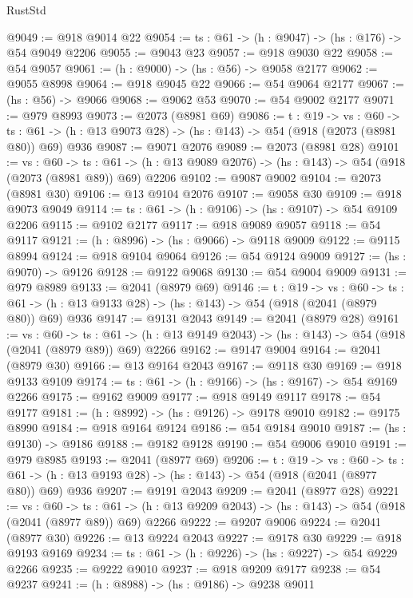 \begin{lexlean}{RustStd}
\begin{coremodule}
@9049 := @918 @9014 @22
@9054 := {ts : @61} -> (h : @9047) -> (hs : @176) -> @54 @9049 @2206
@9055 := @9043 @23
@9057 := @918 @9030 @22
@9058 := @54 @9057
@9061 := (h : @9000) -> (hs : @56) -> @9058 @2177
@9062 := @9055 @8998
@9064 := @918 @9045 @22
@9066 := @54 @9064 @2177
@9067 := (hs : @56) -> @9066
@9068 := @9062 @53
@9070 := @54 @9002 @2177
@9071 := @979 @8993
@9073 := @2073 (@8981 @69)
@9086 := {t : @19} ->
  {vs : @60} ->
  {ts : @61} -> (h : @13 @9073 @28) -> (hs : @143) -> @54 (@918 (@2073 (@8981 @80)) @69) @936
@9087 := @9071 @2076
@9089 := @2073 (@8981 @28)
@9101 := {vs : @60} ->
  {ts : @61} -> (h : @13 @9089 @2076) -> (hs : @143) -> @54 (@918 (@2073 (@8981 @89)) @69) @2206
@9102 := @9087 @9002
@9104 := @2073 (@8981 @30)
@9106 := @13 @9104 @2076
@9107 := @9058 @30
@9109 := @918 @9073 @9049
@9114 := {ts : @61} -> (h : @9106) -> (hs : @9107) -> @54 @9109 @2206
@9115 := @9102 @2177
@9117 := @918 @9089 @9057
@9118 := @54 @9117
@9121 := (h : @8996) -> (hs : @9066) -> @9118 @9009
@9122 := @9115 @8994
@9124 := @918 @9104 @9064
@9126 := @54 @9124 @9009
@9127 := (hs : @9070) -> @9126
@9128 := @9122 @9068
@9130 := @54 @9004 @9009
@9131 := @979 @8989
@9133 := @2041 (@8979 @69)
@9146 := {t : @19} ->
  {vs : @60} ->
  {ts : @61} -> (h : @13 @9133 @28) -> (hs : @143) -> @54 (@918 (@2041 (@8979 @80)) @69) @936
@9147 := @9131 @2043
@9149 := @2041 (@8979 @28)
@9161 := {vs : @60} ->
  {ts : @61} -> (h : @13 @9149 @2043) -> (hs : @143) -> @54 (@918 (@2041 (@8979 @89)) @69) @2266
@9162 := @9147 @9004
@9164 := @2041 (@8979 @30)
@9166 := @13 @9164 @2043
@9167 := @9118 @30
@9169 := @918 @9133 @9109
@9174 := {ts : @61} -> (h : @9166) -> (hs : @9167) -> @54 @9169 @2266
@9175 := @9162 @9009
@9177 := @918 @9149 @9117
@9178 := @54 @9177
@9181 := (h : @8992) -> (hs : @9126) -> @9178 @9010
@9182 := @9175 @8990
@9184 := @918 @9164 @9124
@9186 := @54 @9184 @9010
@9187 := (hs : @9130) -> @9186
@9188 := @9182 @9128
@9190 := @54 @9006 @9010
@9191 := @979 @8985
@9193 := @2041 (@8977 @69)
@9206 := {t : @19} ->
  {vs : @60} ->
  {ts : @61} -> (h : @13 @9193 @28) -> (hs : @143) -> @54 (@918 (@2041 (@8977 @80)) @69) @936
@9207 := @9191 @2043
@9209 := @2041 (@8977 @28)
@9221 := {vs : @60} ->
  {ts : @61} -> (h : @13 @9209 @2043) -> (hs : @143) -> @54 (@918 (@2041 (@8977 @89)) @69) @2266
@9222 := @9207 @9006
@9224 := @2041 (@8977 @30)
@9226 := @13 @9224 @2043
@9227 := @9178 @30
@9229 := @918 @9193 @9169
@9234 := {ts : @61} -> (h : @9226) -> (hs : @9227) -> @54 @9229 @2266
@9235 := @9222 @9010
@9237 := @918 @9209 @9177
@9238 := @54 @9237
@9241 := (h : @8988) -> (hs : @9186) -> @9238 @9011

\end{coremodule}
\end{lexlean}
